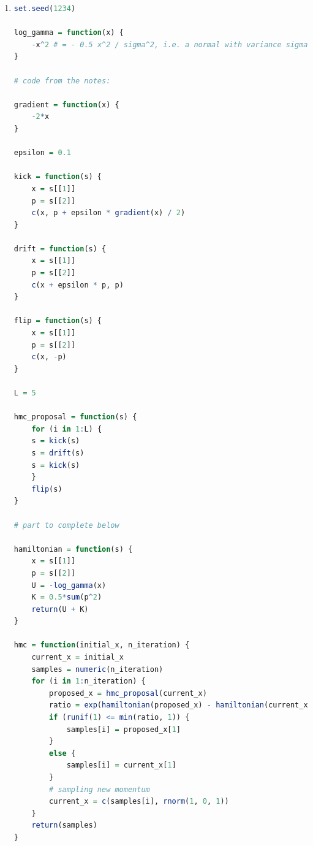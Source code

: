 \documentclass{article}
\begin{document}
\begin{enumerate}
\item 
\begin{lstlisting}[language=R]
set.seed(1234)

log_gamma = function(x) {
    -x^2 # = - 0.5 x^2 / sigma^2, i.e. a normal with variance sigma^2 = 0.5
}

# code from the notes:

gradient = function(x) {
    -2*x
}

epsilon = 0.1

kick = function(s) {
    x = s[[1]]
    p = s[[2]]
    c(x, p + epsilon * gradient(x) / 2)
}

drift = function(s) {
    x = s[[1]]
    p = s[[2]]
    c(x + epsilon * p, p)
}

flip = function(s) {
    x = s[[1]]
    p = s[[2]]
    c(x, -p)
}

L = 5

hmc_proposal = function(s) {
    for (i in 1:L) {
    s = kick(s)
    s = drift(s)
    s = kick(s)
    }
    flip(s)
}

# part to complete below

hamiltonian = function(s) {
    x = s[[1]]
    p = s[[2]]
    U = -log_gamma(x)
    K = 0.5*sum(p^2)
    return(U + K)
}

hmc = function(initial_x, n_iteration) {
    current_x = initial_x
    samples = numeric(n_iteration)
    for (i in 1:n_iteration) {
        proposed_x = hmc_proposal(current_x)
        ratio = exp(hamiltonian(proposed_x) - hamiltonian(current_x))
        if (runif(1) <= min(ratio, 1)) {
            samples[i] = proposed_x[1]
        }
        else {
            samples[i] = current_x[1]
        }
        # sampling new momentum
        current_x = c(samples[i], rnorm(1, 0, 1))
    }
    return(samples)
}
\end{lstlisting}



\end{enumerate}
\end{document}
